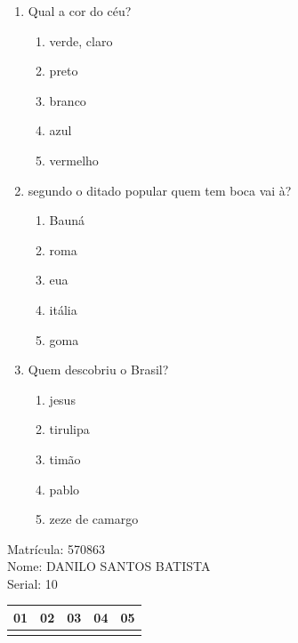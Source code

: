 \documentclass[10pt,a4paper,twocolumn]{report}
\begin{document}
 \begin{enumerate} 
    \item  Qual a cor do céu?





    \begin{enumerate}
    \item  verde, claro

\item  preto

\item  branco

\item  azul

\item  vermelho


    \end{enumerate} 
    \item  segundo o ditado popular quem tem boca vai à?





    \begin{enumerate}
    \item  Bauná

\item  roma

\item  eua

\item  itália

\item  goma


    \end{enumerate} 
    \item  Quem descobriu o Brasil?





    \begin{enumerate}
    \item  jesus

\item  tirulipa

\item  timão

\item  pablo

\item  zeze de camargo


    \end{enumerate}\end{enumerate} 
Matrícula: 570863\\ Nome: DANILO SANTOS BATISTA \\ Serial: 10\\
\begin{tabular}{|l|l|l|l|l|}\hline
01  &02  &03  &04  &05 \\ \hline 
 & & & & \\ \hline 
\end{tabular}
 \cleardoublepage 
\end{document}
